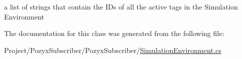a list of strings that contain the I\+Ds of all the active tags in the Simulation Environment 



The documentation for this class was generated from the following file\+:\begin{DoxyCompactItemize}
\item 
Project/\+Pozyx\+Subscriber/\+Pozyx\+Subscriber/\hyperlink{_simulation_environment_8cs}{Simulation\+Environment.\+cs}\end{DoxyCompactItemize}
